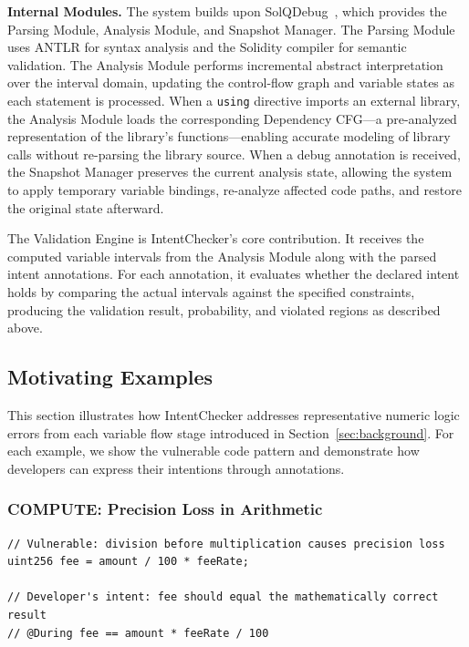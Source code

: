 \documentclass[pdflatex,sn-basic]{sn-jnl}%
\theoremstyle{thmstyleone}%
\theoremstyle{thmstyletwo}%
\theoremstyle{thmstylethree}%
\begin{document}
\smallskip
\noindent\textbf{Internal Modules.}
The system builds upon SolQDebug~\citep{solqdebug}, which provides the Parsing Module, Analysis Module, and Snapshot Manager.
The Parsing Module uses ANTLR for syntax analysis and the Solidity compiler for semantic validation.
The Analysis Module performs incremental abstract interpretation over the interval domain, updating the control-flow graph and variable states as each statement is processed.
When a \texttt{using} directive imports an external library, the Analysis Module loads the corresponding Dependency CFG---a pre-analyzed representation of the library's functions---enabling accurate modeling of library calls without re-parsing the library source.
When a debug annotation is received, the Snapshot Manager preserves the current analysis state, allowing the system to apply temporary variable bindings, re-analyze affected code paths, and restore the original state afterward.

The Validation Engine is IntentChecker's core contribution.
It receives the computed variable intervals from the Analysis Module along with the parsed intent annotations.
For each annotation, it evaluates whether the declared intent holds by comparing the actual intervals against the specified constraints, producing the validation result, probability, and violated regions as described above.

\subsection{Motivating Examples}

This section illustrates how IntentChecker addresses representative numeric logic errors from each variable flow stage introduced in Section~\ref{sec:background}.
For each example, we show the vulnerable code pattern and demonstrate how developers can express their intentions through annotations.

\subsubsection{COMPUTE: Precision Loss in Arithmetic}


\begin{lstlisting}[caption={Example: Precision loss in fee calculation}, label={lst:compute-example}]
// Vulnerable: division before multiplication causes precision loss
uint256 fee = amount / 100 * feeRate;

// Developer's intent: fee should equal the mathematically correct result
// @During fee == amount * feeRate / 100
\end{lstlisting}
\end{document}
